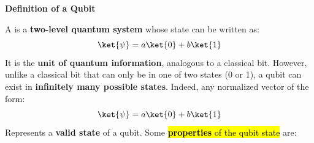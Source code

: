 \highspace
\begin{flushleft}
    \textcolor{Green3}{ \textbf{Definition of a Qubit}}
\end{flushleft}
A  is a \textbf{two-level quantum system} whose state can be written as:
\begin{equation*}
    \ket{\psi} = a \ket{0} + b \ket{1}
\end{equation*}
It is the \textbf{unit of quantum information}, analogous to a classical bit. However, unlike a classical bit that can only be in one of two states (0 or 1), a qubit can exist in \textbf{infinitely many possible states}. Indeed, any normalized vector of the form:
\begin{equation*}
    \ket{\psi} = a \ket{0} + b \ket{1}
\end{equation*}
Represents a \textbf{valid state} of a qubit. Some \hl{\textbf{properties} of the qubit state} are:
